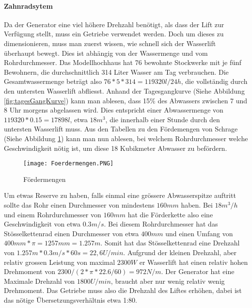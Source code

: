 \newpage

\paragraph{Zahnradsytem}
Da der Generator eine viel höhere Drehzahl benötigt, als dass der Lift zur Verfügung stellt, muss ein Getriebe verwendet werden. Doch um dieses zu dimensionieren, muss man zuerst wissen, wie schnell sich der Wasserlift überhaupt bewegt. Dies ist abhängig von der Wassermenge und vom Rohrdurchmesser. Das Modellhochhaus hat 76 bewohnte Stockwerke mit je fünf Bewohnern, die durchschnittlich 314 Liter Wasser am Tag verbrauchen. Die Gesamtwassermenge beträgt also \(76 * 5 * 314 = 119320 l/24h\), die vollständig durch den untersten Wasserlift abfliesst. Anhand der Tagesgangkurve (Siehe Abbildung \ref{fig:tagesGangKurve}) kann man ablesen, dass 15\% des Abwassers zwischen 7 und 8 Uhr morgens abgelassen wird. Dies entspricht einer Abwassermenge von \(119320 * 0.15 = 17898 l\), etwa \(18 m^3 \), die innerhalb einer Stunde durch den untersten Wasserlift muss. Aus den Tabellen zu den Fördemengen von Schrage (Siehe Abbildung \ref{fig:foerdermengen}) kann man nun ablesen, bei welchem Rohrdurchmesser welche Geschwindigkeit nötig ist, um diese 18 Kubikmeter Abwasser zu befördern. 

\begin{figure} [H]
	\centering
	\texttt{[image: Foerdermengen.PNG]}
	\caption{Fördermengen \cite{schrage}}
	\label{fig:foerdermengen}
\end{figure}

Um etwas Reserve zu haben, falls einmal eine grössere Abwasserspitze auftritt sollte das Rohr einen Durchmesser von mindestens \(160mm\) haben. Bei \(18 m^3 /h \) und einem Rohrdurchmesser von \(160mm\) hat die Förderkette also eine Geschwindigkeit von etwa \(0.3 m/s \). Bei diesem Rohrdurchmesser hat das Stösselkettenrad einen Durchmesser von etwa \(400mm\)\cite{schrage} und einen Umfang von \(400mm * \pi = 1257mm = 1.257m\). Somit hat das Stösselkettenrad eine Drehzahl von \(1.257m * 0.3 m/s * 60s = 22,6 U/min\). Aufgrund der kleinen Drehzahl, aber relativ grossen Leistung von maximal \(2300 W\) er Wasserlift hat einen relativ hohen Drehmoment von \( 2300 /(2 * \pi * 22.6/ 60) = 972 N/m\). Der Generator hat eine Maximale Drehzahl von \(1800 U/min\), braucht aber nur wenig relativ wenig Drehmoment. Das Getriebe muss also die Drehzahl des Liftes erhöhen, dabei ist das nötige Übersetzungsverhältnis etwa 1:80. 
 

